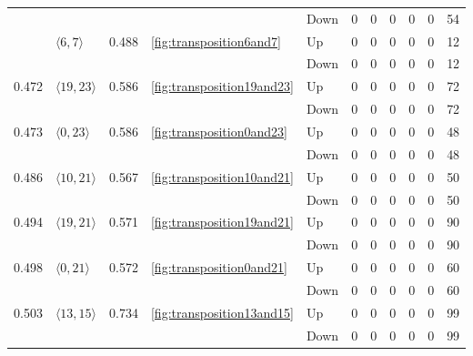 \documentclass{article}
\begin{document}
\begin{center}
\begin{tabular}{lllllrrrrrr}
 &  &  &  & Down & 0 & 0 & 0 & 0 & 0 & 54 \\
\cline{2-11} \cline{3-11} \cline{4-11}
 & \multirow[t]{2}{*}{$\langle6, 7\rangle$} & \multirow[t]{2}{*}{0.488} & \multirow[t]{2}{*}{\ref{fig:transposition6and7}} & Up & 0 & 0 & 0 & 0 & 0 & 12 \\
 &  &  &  & Down & 0 & 0 & 0 & 0 & 0 & 12 \\
\cline{1-11} \cline{2-11} \cline{3-11} \cline{4-11}
\multirow[t]{2}{*}{0.472} & \multirow[t]{2}{*}{$\langle19, 23\rangle$} & \multirow[t]{2}{*}{0.586} & \multirow[t]{2}{*}{\ref{fig:transposition19and23}} & Up & 0 & 0 & 0 & 0 & 0 & 72 \\
 &  &  &  & Down & 0 & 0 & 0 & 0 & 0 & 72 \\
\cline{1-11} \cline{2-11} \cline{3-11} \cline{4-11}
\multirow[t]{2}{*}{0.473} & \multirow[t]{2}{*}{$\langle0, 23\rangle$} & \multirow[t]{2}{*}{0.586} & \multirow[t]{2}{*}{\ref{fig:transposition0and23}} & Up & 0 & 0 & 0 & 0 & 0 & 48 \\
 &  &  &  & Down & 0 & 0 & 0 & 0 & 0 & 48 \\
\cline{1-11} \cline{2-11} \cline{3-11} \cline{4-11}
\multirow[t]{2}{*}{0.486} & \multirow[t]{2}{*}{$\langle10, 21\rangle$} & \multirow[t]{2}{*}{0.567} & \multirow[t]{2}{*}{\ref{fig:transposition10and21}} & Up & 0 & 0 & 0 & 0 & 0 & 50 \\
 &  &  &  & Down & 0 & 0 & 0 & 0 & 0 & 50 \\
\cline{1-11} \cline{2-11} \cline{3-11} \cline{4-11}
\multirow[t]{2}{*}{0.494} & \multirow[t]{2}{*}{$\langle19, 21\rangle$} & \multirow[t]{2}{*}{0.571} & \multirow[t]{2}{*}{\ref{fig:transposition19and21}} & Up & 0 & 0 & 0 & 0 & 0 & 90 \\
 &  &  &  & Down & 0 & 0 & 0 & 0 & 0 & 90 \\
\cline{1-11} \cline{2-11} \cline{3-11} \cline{4-11}
\multirow[t]{2}{*}{0.498} & \multirow[t]{2}{*}{$\langle0, 21\rangle$} & \multirow[t]{2}{*}{0.572} & \multirow[t]{2}{*}{\ref{fig:transposition0and21}} & Up & 0 & 0 & 0 & 0 & 0 & 60 \\
 &  &  &  & Down & 0 & 0 & 0 & 0 & 0 & 60 \\
\cline{1-11} \cline{2-11} \cline{3-11} \cline{4-11}
\multirow[t]{2}{*}{0.503} & \multirow[t]{2}{*}{$\langle13, 15\rangle$} & \multirow[t]{2}{*}{0.734} & \multirow[t]{2}{*}{\ref{fig:transposition13and15}} & Up & 0 & 0 & 0 & 0 & 0 & 99 \\
 &  &  &  & Down & 0 & 0 & 0 & 0 & 0 & 99 \\
\cline{1-11} \cline{2-11} \cline{3-11} \cline{4-11}

\end{tabular}
\end{center}
\end{document}

